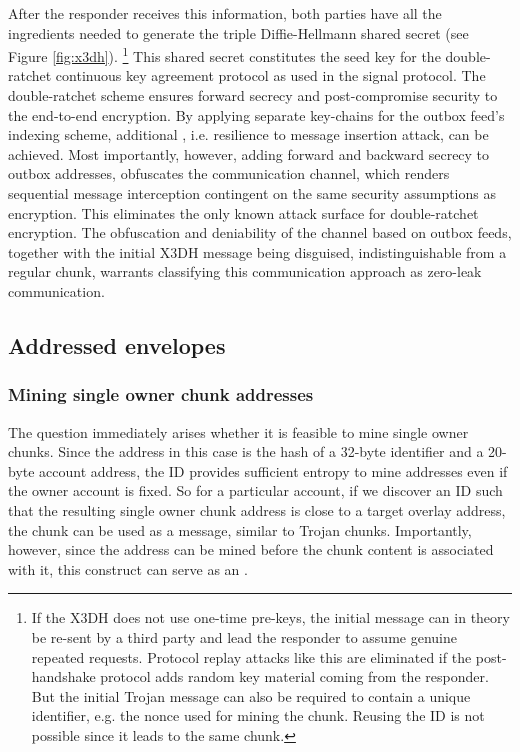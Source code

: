 After the responder receives this information, both parties have all the ingredients needed to generate the triple Diffie-Hellmann shared secret (see Figure \ref{fig:x3dh}).%
%
\footnote{If the X3DH does not use one-time pre-keys, the initial message can in theory be re-sent by a third party and lead the responder to assume genuine repeated requests. Protocol replay attacks like this are eliminated if the post-handshake protocol adds random key material coming from the responder. 
But the initial Trojan message can also be required to contain a unique identifier, e.g. the nonce used for mining the chunk. Reusing the ID is not possible since it leads to the same chunk.}
%
This shared secret constitutes the seed key for the double-ratchet continuous key agreement protocol as used in the signal protocol. The double-ratchet scheme ensures forward secrecy and post-compromise security to the end-to-end encryption. By applying separate key-chains for the outbox feed's indexing scheme, additional , i.e. resilience to message insertion attack, can be achieved. Most importantly, however, adding forward and backward secrecy to outbox addresses, obfuscates the communication channel, which renders sequential message interception contingent on the same security assumptions as encryption. This eliminates the only known attack surface for double-ratchet encryption. The obfuscation and deniability of the channel based on outbox feeds, together with the initial X3DH message being disguised, indistinguishable from a regular chunk, warrants classifying this communication approach as zero-leak communication.

\subsection{Addressed envelopes\statusgreen}\label{sec:addressed-envelopes}

\subsubsection{Mining single owner chunk addresses}

The question immediately arises whether it is feasible to mine single owner chunks. Since the address in this case is the hash of a 32-byte identifier and a 20-byte account address, the ID provides sufficient entropy to mine addresses even if the owner account is fixed. So for a particular account, if we discover an ID such that the resulting single owner chunk address is close to a target overlay address, the chunk can be used as a message, similar to Trojan chunks. Importantly, however, since the address can be mined before the chunk content is associated with it, this construct can serve as an .

